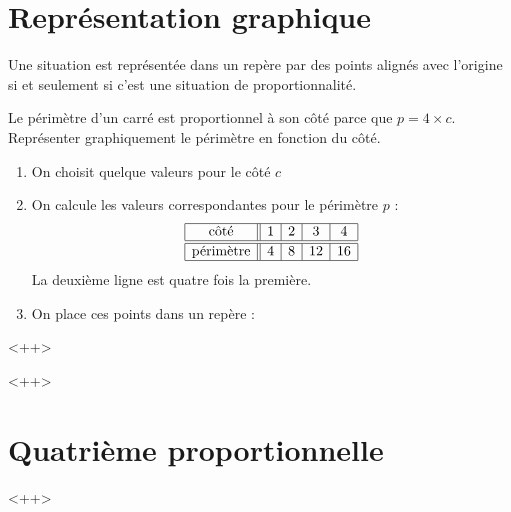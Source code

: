 


\section{Représentation graphique}

\begin{propriete}
    Une situation est représentée dans un repère par des points alignés avec l'origine si et seulement si c'est une situation de proportionnalité.
\end{propriete}

\begin{example}
    Le périmètre d'un carré est proportionnel à son côté parce que \( p=4\times c\). Représenter graphiquement le périmètre en fonction du côté.

    \begin{enumerate}
        \item
            On choisit quelque valeurs pour le côté \( c\)
        \item
            On calcule les valeurs correspondantes pour le périmètre \( p\) :
            \begin{equation*}
                \begin{array}[]{|c||c|c|c|c|}
                    \hline
                    \text{côté}&1&2&3&4\\
                    \hline\hline
                    \text{périmètre}&4&8&12&16\\
                    \hline
                \end{array}
            \end{equation*}
            La deuxième ligne est quatre fois la première.
        \item
            On place ces points dans un repère :
            \begin{center}

            \end{center}
    \end{enumerate}
    <++>

\end{example}
<++>

\section{Quatrième proportionnelle}

<++>
